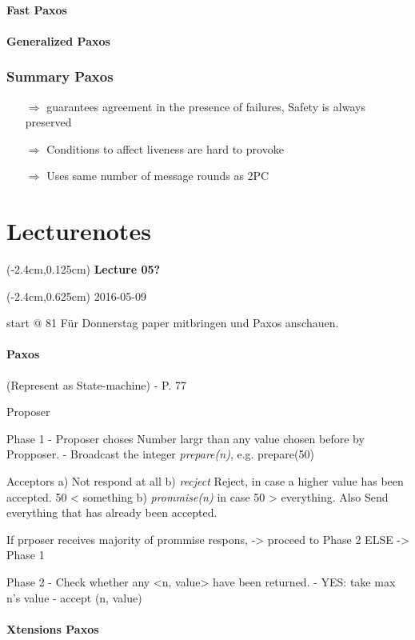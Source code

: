 \documentclass[a4paper,12pt]{article}%
\newcommand{\lecture}[2]{\color{black} 
	
	\begin{textblock*}{3cm}(-2.4cm,0.125cm)
		{\bf Lecture {#1}}
	\end{textblock*}
	
	\begin{textblock*}{3cm}(-2.4cm,0.625cm)
		#2
	\end{textblock*}
}
\begin{document}
\paragraph{Fast Paxos}
\paragraph{Generalized Paxos}
\subsubsection{Summary Paxos}
\begin{itemize}
	\item[$\Rightarrow$] guarantees agreement in the presence of failures, Safety is always preserved
	\item[$\Rightarrow$]  Conditions to affect liveness are hard to provoke
	\item[$\Rightarrow$]  Uses same number of message rounds as 2PC
\end{itemize}

\newpage
\section{Lecturenotes}
\lecture{05?}{2016-05-09} start @ 81
Für Donnerstag paper mitbringen und Paxos anschauen.

\paragraph{Paxos} (Represent as State-machine) - P. 77


Proposer


Phase 1
- Proposer choses Number largr than any value chosen before by Propposer. 
- Broadcast the integer {\it prepare(n)}, e.g. prepare(50)

Acceptors
a) Not respond at all
b) {\it recject} Reject, in case a higher value has been accepted. 50 < something
b) {\it prommise(n)} in case 50 > everything. Also Send everything that has already been accepted.

If prposer receives majority of prommise respons, -> proceed to Phase 2 ELSE -> Phase 1

Phase 2
- Check whether any <n, value> have been returned. 
- YES: take max n's value
- accept (n, value)

\paragraph{Xtensions Paxos}
	
\end{document}
